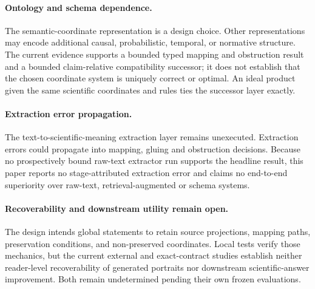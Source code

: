 \paragraph{Ontology and schema dependence.}
The semantic-coordinate representation is a design choice. Other
representations may encode additional causal, probabilistic, temporal, or
normative structure. The current evidence supports a bounded typed mapping and
obstruction result and a bounded claim-relative compatibility successor; it
does not establish that the chosen coordinate system is uniquely correct or
optimal. An ideal product given the same scientific coordinates and rules ties
the successor layer exactly.

\paragraph{Extraction error propagation.}
The text-to-scientific-meaning extraction layer remains unexecuted. Extraction
errors could propagate into mapping, gluing and obstruction decisions. Because
no prospectively bound raw-text extractor run supports the headline result,
this paper reports no stage-attributed extraction error and claims no
end-to-end superiority over raw-text, retrieval-augmented or schema systems.

\paragraph{Recoverability and downstream utility remain open.}
The design intends global statements to retain source projections, mapping
paths, preservation conditions, and non-preserved coordinates. Local tests
verify those mechanics, but the current external and exact-contract studies
establish neither reader-level recoverability of generated portraits nor
downstream scientific-answer improvement. Both remain undetermined pending
their own frozen evaluations.

